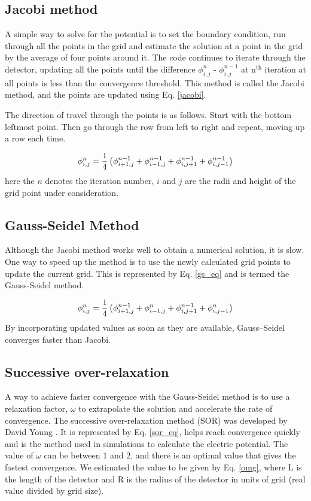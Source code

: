 \subsection*{Jacobi method}
A simple way to solve for the potential is to set the boundary condition, run through all the points in the grid and estimate the solution at a point in the grid by the average of four points around it. The code continues to iterate through the detector, updating all the points until the difference $\phi_{i,j}^{n}$ - $\phi_{i,j}^{n-1}$ at n$^{\text{th}}$ iteration at all points is less than the convergence threshold. This method is called the Jacobi method, and the points are updated using Eq. \ref{jacobi}.

The direction of travel through the points is as follows. Start with the bottom leftmost point. Then go through the row from left to right and repeat, moving up a row each time.


\begin{equation}{\label{jacobi}}
 \phi_{i,j}^{n} = \frac{1}{4}  \left(\phi^{n-1}_{i+1,j} + \phi^{n-1}_{i-1,j} + \phi^{n-1}_{i,j+1} + \phi^{n-1}_{i,j-1} \right)
\end{equation}
here the $n$ denotes the iteration number, $i$ and $j$ are the radii and height of the grid point under consideration. 

\subsection*{Gauss-Seidel Method}

Although the Jacobi method works well to obtain a numerical solution, it is slow. One way to speed up the method is to use the newly calculated grid points to update the current grid. This is represented by Eq. \ref{gs_eq} and is termed the Gauss-Seidel method.


\begin{equation}{\label{gs_eq}}
 \phi_{i,j}^{n} = \frac{1}{4}  \left(\phi^{n-1}_{i+1,j} + \phi^n_{i-1,j} + \phi^{n-1}_{i,j+1} + \phi^n_{i,j-1} \right)
\end{equation}
By incorporating updated values as soon as they are available, Gauss--Seidel converges faster than Jacobi.

\subsection*{Successive over-relaxation}

A way to achieve faster convergence with the Gauss-Seidel method is to use a relaxation factor, $\omega$ to extrapolate the solution and accelerate the rate of convergence. The successive over-relaxation method (SOR) was developed by David Young \cite{Young1950}. It is represented by Eq. \ref{sor_eq}, helps reach convergence quickly and is the method used in {\siggen} simulations to calculate the electric potential. The value of $\omega$ can be between $1$ and $2$, and there is an optimal value that gives the fastest convergence. We estimated the value to be given by Eq. \ref{omg}, where L is the length of the detector and R is the radius of the detector in units of grid (real value divided by grid size). 

